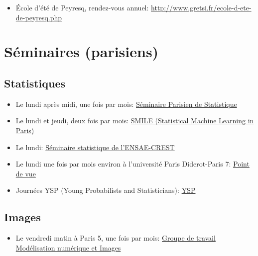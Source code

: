 \begin{itemize}
\item \'Ecole d'été de Peyresq, rendez-vous annuel:
\url{http://www.gretsi.fr/ecole-d-ete-de-peyresq.php}
\end{itemize}


\section{Séminaires (parisiens)}

\subsection{Statistiques}

\begin{itemize}
 \item Le lundi après midi, une fois par mois:
 \href{https://sites.google.com/site/semstats/}{Séminaire Parisien de Statistique}
 \item Le lundi et jeudi, deux fois par mois:  
\href{https://sites.google.com/site/smileinparis/home}{SMILE (Statistical Machine Learning in Paris)}
 \item Le lundi: 
\href{http://certis.enpc.fr/~dalalyan/seminar.html}{Séminaire statistique de l'ENSAE-CREST}
 \item Le lundi une fois par mois environ \`a l'universit\'e Paris Diderot-Paris 7:  
\href{http://dominiquepicard.blogspot.fr/p/seminaire-point-de-vue.html}{Point de vue}
 \item Journ\'ees YSP (Young Probabilists and Statisticians):  
\href{http://www.sfds.asso.fr/362-YSP}{YSP}
\end{itemize}



\subsection{Images}
\begin{itemize}
 
 \item Le vendredi matin \`a Paris 5, une fois par mois:
 \href{http://w3.mi.parisdescartes.fr/map5/-Groupe-de-travail-Modelisation-}
{Groupe de travail Modélisation numérique et Images
}
\end{itemize}
